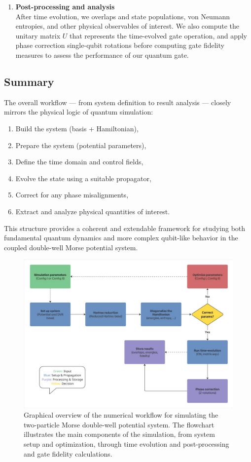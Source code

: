 \documentclass{subfiles}
\begin{document}
\begin{enumerate}
    \item \textbf{Post-processing and analysis} \\
    After time evolution, we overlaps and state populations, von Neumann entropies, and other physical observables of interest. We also compute the unitary matrix $U$ that represents the time-evolved gate operation, and apply phase correction single-qubit rotations before computing gate fidelity measures to assess the performance of our quantum gate. 
\end{enumerate}
\subsection*{Summary}

The overall workflow — from system definition to result analysis — closely mirrors the physical logic of quantum simulation:
\begin{enumerate}
    \item Build the system (basis + Hamiltonian),
    \item Prepare the system (potential parameters),
    \item Define the time domain and control fields,
    \item Evolve the state using a suitable propagator,
    \item Correct for any phase misalignments,
    \item Extract and analyze physical quantities of interest.
\end{enumerate}

This structure provides a coherent and extendable framework for studying both fundamental quantum dynamics and more complex qubit-like behavior in the coupled double-well Morse potential system.

\begin{figure}[h!]
    \centering
    \includegraphics[width=1.0\textwidth]{figs/Flowchart.pdf}
    \caption{Graphical overview of the numerical workflow for simulating the two-particle Morse double-well potential system. The flowchart illustrates the main components of the simulation, from system setup and optimization, through time evolution and post-processing and gate fidelity calculations. }
\end{figure}
\end{document}
